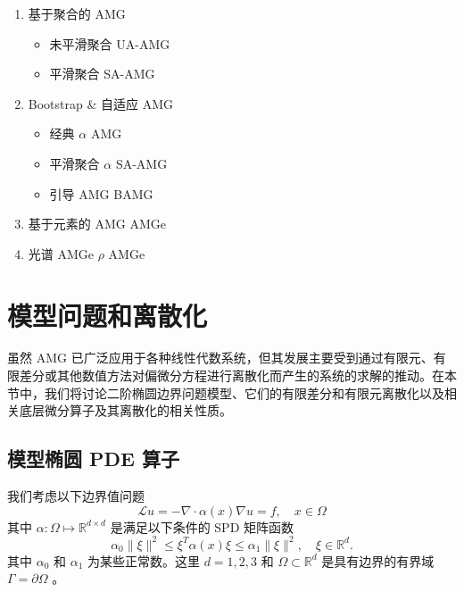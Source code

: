 \documentclass[12pt]{acta_2011xz}
\begin{document}
   \begin{enumerate}

   \item   基于聚合的 AMG 
   \begin{itemize}

   \item   未平滑聚合    \hfill    UA-AMG   \item   平滑聚合    \hfill    SA-AMG  \end{itemize}      \item   Bootstrap \& 自适应 AMG 
   \begin{itemize}

   \item   经典    \hfill             $\alpha$          AMG   \item   平滑聚合    \hfill             $\alpha$          SA-AMG   \item   引导 AMG    \hfill    BAMG  \end{itemize}      \item   基于元素的 AMG    \hfill    AMGe   \item   光谱 AMGe    \hfill       $\rho$    AMGe  \end{enumerate}     

   \section{模型问题和离散化  }    虽然 AMG 已广泛应用于各种线性代数系统，但其发展主要受到通过有限元、有限差分或其他数值方法对偏微分方程进行离散化而产生的系统的求解的推动。在本节中，我们将讨论二阶椭圆边界问题模型、它们的有限差分和有限元离散化以及相关底层微分算子及其离散化的相关性质。  

   \subsection{模型椭圆 PDE 算子  }    我们考虑以下边界值问题
   \begin{equation}
  \label{Model0}
{\mathcal L}u=-\nabla\cdot \alpha(x)\nabla u=f, \quad x\in \Omega
\end{equation}    其中    $\alpha: \Omega\mapsto \mathbb R^{d\times d}$    是满足以下条件的 SPD 矩阵函数
   \begin{equation}
  \label{alpha}
\alpha_0\|\xi\|^2\le 
\xi^T\alpha (x)\xi \le
\alpha_1\|\xi\|^2,\quad \xi\in \mathbb R^d.
\end{equation}    其中    $\alpha_0$    和    $\alpha_1$    为某些正常数。这里    $d=1,2,3$    和    $\Omega\subset\mathbb R^d$    是具有边界的有界域
   $\Gamma=\partial \Omega$    。  
\end{document}
